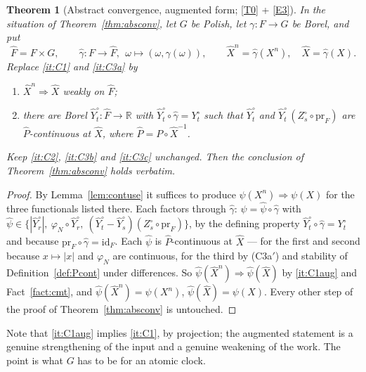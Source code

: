 \documentclass[11pt,a4paper]{article}
\theoremstyle{plain}
\newtheorem{theorem}{Theorem}[section]
\theoremstyle{definition}
\theoremstyle{remark}
\newcommand{\R}{\mathbb{R}}
\DeclareMathOperator*{\wto}{\Rightarrow}
\begin{document}
\begin{theorem}[Abstract convergence, augmented form; \eqref{T0} + \eqref{E3}]
  \label{thm:absconvaug}
  In the situation of Theorem~\ref{thm:absconv}, let $G$ be Polish, let
  $\gamma : F \to G$ be Borel, and put
  \[
    \hat{F} = F \times G , \qquad
    \hat\gamma : F \to \hat{F}, \ \ \omega \mapsto (\omega,\gamma(\omega)) ,
    \qquad \hat{X}^n = \hat\gamma(X^n) , \quad \hat{X} = \hat\gamma(X) .
  \]
  Replace \ref{it:C1} and \ref{it:C3a} by
  \begin{enumerate}[label=(C\arabic*$'$),start=1]
  \item \label{it:C1aug}
    $\hat{X}^n \wto \hat{X}$ weakly on $\hat{F}$;
  \item[\textup{(C3a$'$)}] \label{it:C3aaug}
    there are Borel $\hat{Y}^\circ_t : \hat{F} \to \R$ with
    $\hat{Y}^\circ_t \circ \hat\gamma = Y^\circ_t$ such that $\hat{Y}^\circ_t$ and
    $\hat{Y}^\circ_t \, (Z^\circ_s \circ \mathrm{pr}_F)$ are $\hat{P}$-continuous
    at $\hat{X}$, where $\hat{P} = P \circ \hat{X}^{-1}$.
  \end{enumerate}
  Keep \ref{it:C2}, \ref{it:C3b} and \ref{it:C3c} unchanged.  Then the conclusion
  of Theorem~\ref{thm:absconv} holds verbatim.
\end{theorem}

\begin{proof}
  By Lemma~\ref{lem:contuse} it suffices to produce
  $\psi(X^n) \wto \psi(X)$ for the three functionals listed there.  Each factors
  through $\hat\gamma$: $\psi = \hat\psi \circ \hat\gamma$ with
  $\hat\psi \in \{ |\hat{Y}^\circ_r| ,\ \varphi_N \circ \hat{Y}^\circ_r ,\
  (\hat{Y}^\circ_t - \hat{Y}^\circ_s)(Z^\circ_s \circ \mathrm{pr}_F) \}$, by the
  defining property $\hat{Y}^\circ_t \circ \hat\gamma = Y^\circ_t$ and because
  $\mathrm{pr}_F \circ \hat\gamma = \mathrm{id}_F$.  Each $\hat\psi$ is
  $\hat{P}$-continuous at $\hat{X}$ --- for the first and second because
  $x \mapsto |x|$ and $\varphi_N$ are continuous, for the third by
  \textup{(C3a$'$)} and stability of Definition~\ref{def:Pcont} under
  differences.  So $\hat\psi(\hat{X}^n) \wto \hat\psi(\hat{X})$ by
  \ref{it:C1aug} and Fact~\ref{fact:cmt}, and
  $\hat\psi(\hat{X}^n) = \psi(X^n)$, $\hat\psi(\hat{X}) = \psi(X)$.  Every other
  step of the proof of Theorem~\ref{thm:absconv} is untouched.
\end{proof}

Note that \ref{it:C1aug} implies \ref{it:C1}, by projection; the augmented
statement is a genuine strengthening of the input and a genuine weakening of the
work.  The point is what $G$ has to be for an atomic clock.
\end{document}
